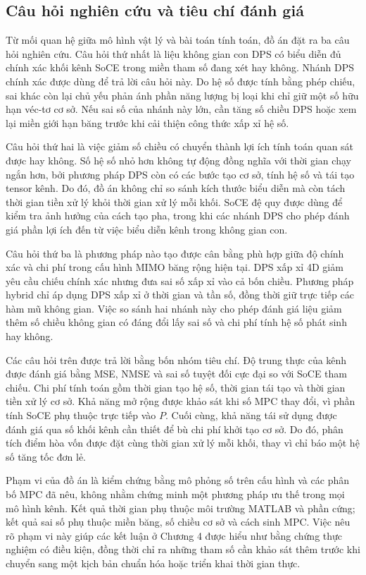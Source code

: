 \subsection{Câu hỏi nghiên cứu và tiêu chí đánh giá}
\label{subsec:ch1_research_questions}

Từ mối quan hệ giữa mô hình vật lý và bài toán tính toán, đồ án đặt ra ba câu hỏi nghiên cứu. Câu hỏi thứ nhất là liệu không gian con DPS có biểu diễn đủ chính xác khối kênh SoCE trong miền tham số đang xét hay không. Nhánh DPS chính xác được dùng để trả lời câu hỏi này. Do hệ số được tính bằng phép chiếu, sai khác còn lại chủ yếu phản ánh phần năng lượng bị loại khi chỉ giữ một số hữu hạn véc-tơ cơ sở. Nếu sai số của nhánh này lớn, cần tăng số chiều DPS hoặc xem lại miền giới hạn băng trước khi cải thiện công thức xấp xỉ hệ số.

Câu hỏi thứ hai là việc giảm số chiều có chuyển thành lợi ích tính toán quan sát được hay không. Số hệ số nhỏ hơn không tự động đồng nghĩa với thời gian chạy ngắn hơn, bởi phương pháp DPS còn có các bước tạo cơ sở, tính hệ số và tái tạo tensor kênh. Do đó, đồ án không chỉ so sánh kích thước biểu diễn mà còn tách thời gian tiền xử lý khỏi thời gian xử lý mỗi khối. SoCE đệ quy được dùng để kiểm tra ảnh hưởng của cách tạo pha, trong khi các nhánh DPS cho phép đánh giá phần lợi ích đến từ việc biểu diễn kênh trong không gian con.

Câu hỏi thứ ba là phương pháp nào tạo được cân bằng phù hợp giữa độ chính xác và chi phí trong cấu hình MIMO băng rộng hiện tại. DPS xấp xỉ 4D giảm yêu cầu chiếu chính xác nhưng đưa sai số xấp xỉ vào cả bốn chiều. Phương pháp hybrid chỉ áp dụng DPS xấp xỉ ở thời gian và tần số, đồng thời giữ trực tiếp các hàm mũ không gian. Việc so sánh hai nhánh này cho phép đánh giá liệu giảm thêm số chiều không gian có đáng đổi lấy sai số và chi phí tính hệ số phát sinh hay không.

Các câu hỏi trên được trả lời bằng bốn nhóm tiêu chí. Độ trung thực của kênh được đánh giá bằng MSE, NMSE và sai số tuyệt đối cực đại so với SoCE tham chiếu. Chi phí tính toán gồm thời gian tạo hệ số, thời gian tái tạo và thời gian tiền xử lý cơ sở. Khả năng mở rộng được khảo sát khi số MPC thay đổi, vì phần tính SoCE phụ thuộc trực tiếp vào \(P\). Cuối cùng, khả năng tái sử dụng được đánh giá qua số khối kênh cần thiết để bù chi phí khởi tạo cơ sở. Do đó, phân tích điểm hòa vốn được đặt cùng thời gian xử lý mỗi khối, thay vì chỉ báo một hệ số tăng tốc đơn lẻ.

Phạm vi của đồ án là kiểm chứng bằng mô phỏng số trên cấu hình và các phân bố MPC đã nêu, không nhằm chứng minh một phương pháp ưu thế trong mọi mô hình kênh. Kết quả thời gian phụ thuộc môi trường MATLAB và phần cứng; kết quả sai số phụ thuộc miền băng, số chiều cơ sở và cách sinh MPC. Việc nêu rõ phạm vi này giúp các kết luận ở Chương 4 được hiểu như bằng chứng thực nghiệm có điều kiện, đồng thời chỉ ra những tham số cần khảo sát thêm trước khi chuyển sang một kịch bản chuẩn hóa hoặc triển khai thời gian thực.

